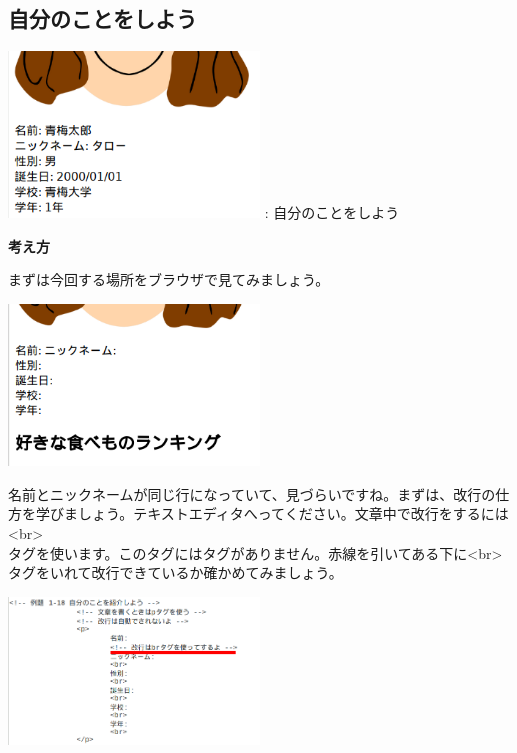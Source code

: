 \documentclass[a4paper,12pt]{jarticle}
\begin{document}
\clearpage
{}
\subsection{\theExercise 自分のことをしよう}
\centering
\begin{minipage}{\textwidth}
  \includegraphics[width=0.5\textwidth]{textbook-img173.png}
  \newline
  : 自分のことをしよう
\end{minipage}

\bigskip

\flushleft

\textbf{考え方}


\bigskip

まずは今回する場所をブラウザで見てみましょう。

\includegraphics[width=0.5\textwidth]{textbook-img175.png}

\bigskip

\flushleft
名前とニックネームが同じ行になっていて、見づらいですね。まずは、改行の仕方を学びましょう。テキストエディタへってください。文章中で改行をするには\\
{\textless}br{\textgreater} \ \ \ \ \ \\
タグを使います。このタグにはタグがありません。赤線を引いてある下に{\textless}br{\textgreater}タグをいれて改行できているか確かめてみましょう。


\includegraphics[width=0.5\textwidth]{textbook-img174.png}
\end{document}
